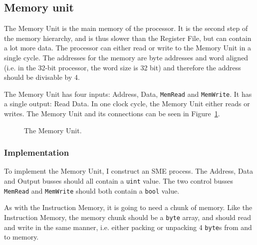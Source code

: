 \subsection{Memory unit}
The Memory Unit is the main memory of the processor. It is the second step of
the memory hierarchy, and is thus slower than the Register File, but can
contain a lot more data. The processor can either read or write to the Memory
Unit in a single cycle. The addresses for the memory are byte addresses and
word aligned (i.e. in the 32-bit processor, the word size is 32 bit) and
therefore the address should be divisable by 4.

The Memory Unit has four inputs: Address, Data, \texttt{MemRead} and
\texttt{MemWrite}. It has a single output: Read Data. In one clock cycle, the
Memory Unit either reads or writes. The Memory Unit and its connections can be
seen in Figure~\ref{fig:mem}.
\begin{figure}
    \centering
    \caption{The Memory Unit.}
    \label{fig:mem}
\end{figure}

\subsubsection*{Implementation}
To implement the Memory Unit, I construct an SME process. The Address, Data
and Output busses should all contain a \texttt{uint} value. The two control
busses \texttt{MemRead} and \texttt{MemWrite} should both contain a
\texttt{bool} value.

As with the Instruction Memory, it is going to need a chunk of memory. Like
the Instruction Memory, the memory chunk should be a \texttt{byte} array, and
should read and write in the same manner, i.e. either packing or unpacking 4
\texttt{byte}s from and to memory.

